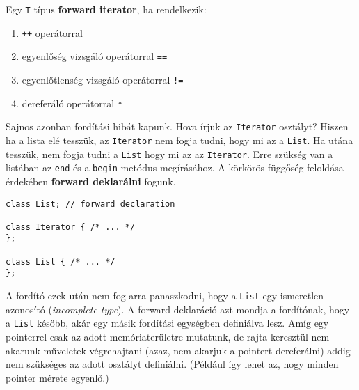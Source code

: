 \documentclass[../cpp_book/cpp_book.tex]{subfiles}
\begin{document}
	Egy \texttt{T} típus \textbf{forward iterator}, ha rendelkezik:
	\begin{enumerate}
		\item \texttt{++} operátorral
		\item egyenlőség vizsgáló operátorral \texttt{==}
		\item egyenlőtlenség vizsgáló operátorral \texttt{!=}
		\item dereferáló operátorral \texttt{*}
	\end{enumerate}
	Sajnos azonban fordítási hibát kapunk. Hova írjuk az \texttt{Iterator} osztályt? Hiszen ha a lista elé tesszük, az \texttt{Iterator} nem fogja tudni, hogy mi az a \texttt{List}. Ha utána tesszük, nem fogja tudni a \texttt{List} hogy mi az az \texttt{Iterator}. Erre szükség van a listában az \texttt{end} és a \texttt{begin} metódus megírásához. A körkörös függőség feloldása érdekében \textbf{forward deklarálni} fogunk. 
	\begin{lstlisting}
class List; // forward declaration

class Iterator { /* ... */
};

class List { /* ... */
};
	\end{lstlisting}
	A fordító ezek után nem fog arra panaszkodni, hogy a \texttt{List} egy ismeretlen azonosító (\textit{incomplete type}). A forward deklaráció azt mondja a fordítónak, hogy a \texttt{List} később, akár egy másik fordítási egységben definiálva lesz. Amíg egy pointerrel csak az adott memóriaterületre mutatunk, de rajta keresztül nem akarunk műveletek végrehajtani (azaz, nem akarjuk a pointert dereferálni) addig nem szükséges az adott osztályt definiálni. (Például így lehet az, hogy minden pointer mérete egyenlő.)
	
\end{document}
